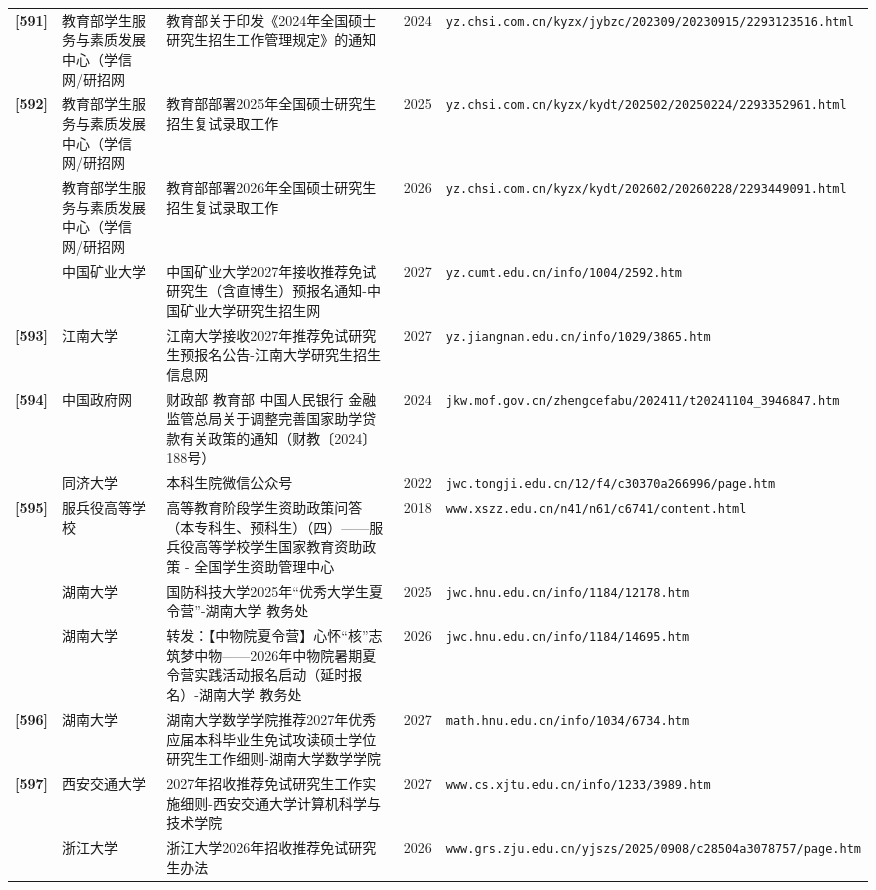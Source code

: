 {\begin{longtable}{@{}p{1.15cm}p{2.9cm}p{6.3cm}p{0.85cm}p{5.0cm}@{}}
\textbf{[591]} & 教育部学生服务与素质发展中心（学信网/研招网 & 教育部关于印发《2024年全国硕士研究生招生工作管理规定》的通知 & 2024 & \texttt{yz.chsi.com.cn/kyzx/jybzc/202309/20230915/2293123516.html} \\
\textbf{[592]} & 教育部学生服务与素质发展中心（学信网/研招网 & 教育部部署2025年全国硕士研究生招生复试录取工作 & 2025 & \texttt{yz.chsi.com.cn/kyzx/kydt/202502/20250224/2293352961.html} \\
[0] & 教育部学生服务与素质发展中心（学信网/研招网 & 教育部部署2026年全国硕士研究生招生复试录取工作 & 2026 & \texttt{yz.chsi.com.cn/kyzx/kydt/202602/20260228/2293449091.html} \\
[0] & 中国矿业大学 & 中国矿业大学2027年接收推荐免试研究生（含直博生）预报名通知-中国矿业大学研究生招生网 & 2027 & \texttt{yz.cumt.edu.cn/info/1004/2592.htm} \\
\textbf{[593]} & 江南大学 & 江南大学接收2027年推荐免试研究生预报名公告-江南大学研究生招生信息网 & 2027 & \texttt{yz.jiangnan.edu.cn/info/1029/3865.htm} \\
\textbf{[594]} & 中国政府网 & 财政部 教育部 中国人民银行 金融监管总局关于调整完善国家助学贷款有关政策的通知（财教〔2024〕188号） & 2024 & \texttt{jkw.mof.gov.cn/zhengcefabu/202411/t20241104\_3946847.htm} \\
[0] & 同济大学 & 本科生院微信公众号 & 2022 & \texttt{jwc.tongji.edu.cn/12/f4/c30370a266996/page.htm} \\
\textbf{[595]} & 服兵役高等学校 & 高等教育阶段学生资助政策问答（本专科生、预科生）（四）——服兵役高等学校学生国家教育资助政策 - 全国学生资助管理中心 & 2018 & \texttt{www.xszz.edu.cn/n41/n61/c6741/content.html} \\
[0] & 湖南大学 & 国防科技大学2025年“优秀大学生夏令营”-湖南大学 教务处 & 2025 & \texttt{jwc.hnu.edu.cn/info/1184/12178.htm} \\
[0] & 湖南大学 & 转发：【中物院夏令营】心怀“核”志 筑梦中物——2026年中物院暑期夏令营实践活动报名启动（延时报名）-湖南大学 教务处 & 2026 & \texttt{jwc.hnu.edu.cn/info/1184/14695.htm} \\
\textbf{[596]} & 湖南大学 & 湖南大学数学学院推荐2027年优秀应届本科毕业生免试攻读硕士学位研究生工作细则-湖南大学数学学院 & 2027 & \texttt{math.hnu.edu.cn/info/1034/6734.htm} \\
\textbf{[597]} & 西安交通大学 & 2027年招收推荐免试研究生工作实施细则-西安交通大学计算机科学与技术学院 & 2027 & \texttt{www.cs.xjtu.edu.cn/info/1233/3989.htm} \\
[0] & 浙江大学 & 浙江大学2026年招收推荐免试研究生办法 & 2026 & \texttt{www.grs.zju.edu.cn/yjszs/2025/0908/c28504a3078757/page.htm} \\

\end{longtable}}
